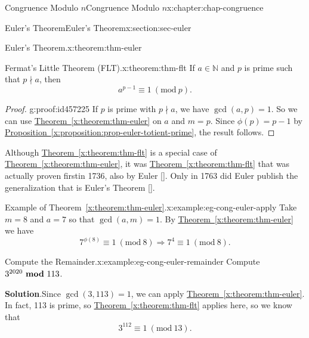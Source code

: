 \documentclass[oneside,10pt,]{book}
\newcommand{\blocktitlefont}{\relax}
\newcommand{\xreffont}{\relax}
\numberwithin{equation}{section}
\newcommand{\Mod}[1]{\ \left(\mathrm{mod}\ #1\right)}
\newcommand{\mmod}[1]{\ \mathrm{\bf mod}\ #1}
\begin{document}
\begin{chapterptx}{Congruence Modulo \(n\)}{}{Congruence Modulo \(n\)}{}{}{x:chapter:chap-congruence}
\begin{sectionptx}{Euler's Theorem}{}{Euler's Theorem}{}{}{x:section:sec-euler}
\begin{theorem}{Euler's Theorem.}{}{x:theorem:thm-euler}
%
\end{theorem}
\begin{theorem}{Fermat's Little Theorem (FLT).}{}{x:theorem:thm-flt}%
If \(a \in \mathbb{N}\) and \(p\) is prime such that \(p \nmid a\), then%
\begin{equation*}
a^{p-1} \equiv 1 \Mod{p}\text{.}
\end{equation*}
%
\end{theorem}
\begin{proof}{}{g:proof:id457225}
If \(p\) is prime with \(p \nmid a\), we have \(\gcd(a,p) = 1\). So we can use \hyperref[x:theorem:thm-euler]{Theorem~{\xreffont\ref{x:theorem:thm-euler}}} on \(a\) and \(m = p\). Since \(\phi(p) = p-1\) by \hyperref[x:proposition:prop-euler-totient-prime]{Proposition~{\xreffont\ref{x:proposition:prop-euler-totient-prime}}}, the result follows.%
\end{proof}
Although \hyperref[x:theorem:thm-flt]{Theorem~{\xreffont\ref{x:theorem:thm-flt}}} is a special case of \hyperref[x:theorem:thm-euler]{Theorem~{\xreffont\ref{x:theorem:thm-euler}}}, it was \hyperref[x:theorem:thm-flt]{Theorem~{\xreffont\ref{x:theorem:thm-flt}}} that was actually proven first\textemdash{}in 1736, also by Euler \hyperlink{x:biblio:bib-euler-54}{[{\xreffont 1}]}. Only in 1763 did Euler publish the generalization that is Euler's Theorem \hyperlink{x:biblio:bib-euler-271}{[{\xreffont 2}]}.%
\begin{example}{Example of Theorem~{\xreffont\ref*{x:theorem:thm-euler}}.}{x:example:eg-cong-euler-apply}%
Take \(m = 8\) and \(a = 7\) so that \(\gcd(a,m) = 1\). By \hyperref[x:theorem:thm-euler]{Theorem~{\xreffont\ref{x:theorem:thm-euler}}} we have%
\begin{equation*}
7^{\phi(8)} \equiv 1 \Mod{8} \Rightarrow 7^4 \equiv 1 \Mod{8}\text{.}
\end{equation*}
%
\end{example}
\begin{example}{Compute the Remainder.}{x:example:eg-cong-euler-remainder}%
Compute \(3^{2020} \mmod 113\).%
\par\smallskip%
\noindent\textbf{\blocktitlefont Solution}.\hypertarget{g:solution:id457597}{}\quad{}Since \(\gcd(3,113) = 1\), we can apply \hyperref[x:theorem:thm-euler]{Theorem~{\xreffont\ref{x:theorem:thm-euler}}}. In fact, 113 is prime, so \hyperref[x:theorem:thm-flt]{Theorem~{\xreffont\ref{x:theorem:thm-flt}}} applies here, so we know that%
\begin{equation*}
3^{112} \equiv 1 \Mod{13}\text{.}
\end{equation*}

\end{example}
\end{sectionptx}
\end{chapterptx}
\end{document}
